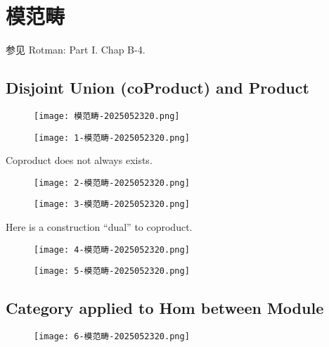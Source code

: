 \section{模范畴}

参见 Rotman: Part I. Chap B-4.

\subsection{Disjoint Union (coProduct) and Product}

\begin{figure}[H]
\centering
\texttt{[image: 模范畴-2025052320.png]}
\label{}
\end{figure}

\begin{figure}[H]
\centering
\texttt{[image: 1-模范畴-2025052320.png]}
\label{}
\end{figure}

Coproduct does not always exists.

\begin{figure}[H]
\centering
\texttt{[image: 2-模范畴-2025052320.png]}
\label{}
\end{figure}

\begin{figure}[H]
\centering
\texttt{[image: 3-模范畴-2025052320.png]}
\label{}
\end{figure}

Here is a construction “dual” to coproduct.

\begin{figure}[H]
\centering
\texttt{[image: 4-模范畴-2025052320.png]}
\label{}
\end{figure}

\begin{figure}[H]
\centering
\texttt{[image: 5-模范畴-2025052320.png]}
\label{}
\end{figure}

\subsection{Category applied to Hom between Module}

\begin{figure}[H]
\centering
\texttt{[image: 6-模范畴-2025052320.png]}
\label{}
\end{figure}

